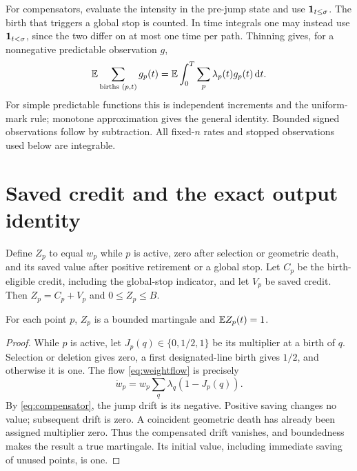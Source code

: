 For compensators, evaluate the intensity in the pre-jump state and use
\(\mathbf 1_{t\le\sigma}\). The birth that triggers a global stop is counted.
In time integrals one may instead use \(\mathbf 1_{t<\sigma}\), since the
two differ on at most one time per path. Thinning gives, for a
nonnegative predictable observation \(g\),
\begin{equation}\label{eq:compensator}
 \mathbb E\sum_{\text{births }(p,t)}g_p(t)
 =\mathbb E\int_0^T\sum_p\lambda_p(t)g_p(t)\,\mathrm d t.
\end{equation}
For simple predictable functions this is independent increments and
the uniform-mark rule; monotone approximation gives the general
identity. Bounded signed observations follow by subtraction. All
fixed-\(n\) rates and stopped observations used below are integrable.

\section{Saved credit and the exact output identity}\label{sec:loss}

Define \(Z_p\) to equal \(w_p\) while \(p\) is active, zero after
selection or geometric death, and its saved value after positive
retirement or a global stop. Let \(C_p\) be the birth-eligible credit,
including the global-stop indicator, and let \(V_p\) be saved credit.
Then \(Z_p=C_p+V_p\) and \(0\le Z_p\le B\).

\begin{lemma}\label{lem:credit}
For each point \(p\), \(Z_p\) is a bounded martingale and
\(\mathbb E Z_p(t)=1\).
\end{lemma}
\begin{proof}
While \(p\) is active, let \(J_p(q)\in\{0,1/2,1\}\) be its
multiplier at a birth of \(q\). Selection or deletion gives zero,
a first designated-line birth gives \(1/2\), and otherwise it is one.
The flow \eqref{eq:weightflow} is precisely
\[
 \dot w_p=w_p\sum_q\lambda_q(1-J_p(q)).
\]
By \eqref{eq:compensator}, the jump drift is its negative. Positive
saving changes no value; subsequent drift is zero. A coincident
geometric death has already been assigned multiplier zero. Thus the
compensated drift vanishes, and boundedness makes the result a true
martingale. Its initial value, including immediate saving of unused
points, is one.
\end{proof}

